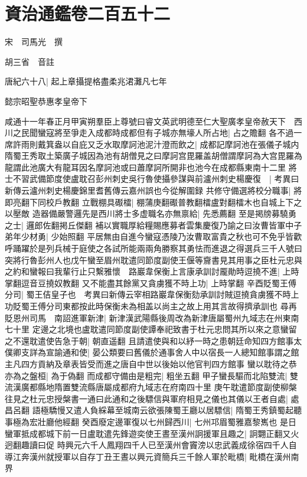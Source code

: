 \chapter{資治通鑑卷二百五十二}
宋　司馬光　撰

胡三省　音註

唐紀六十八|{
	起上章攝提格盡柔兆涒灘凡七年}


懿宗昭聖恭惠孝皇帝下

咸通十一年春正月甲寅朔羣臣上尊號曰睿文英武明德至仁大聖廣孝皇帝赦天下　西川之民聞蠻寇將至爭走入成都時成都但有子城亦無壕人所占地|{
	占之贍翻}
各不過一席許雨則戴箕盎以自庇又乏水取摩訶池泥汁澄而飲之|{
	成都記摩訶池在張儀子城内隋蜀王秀取土築廣子城因為池有胡僧見之曰摩訶宫毘羅盖胡僧謂摩訶為大宫毘羅為龍謂此池廣大有龍耳因名摩訶池或曰蕭摩訶所開非也池今在成都縣東南十二里}
將士不習武備節度使盧耽召彭州刺史吳行魯使攝參謀與前瀘州刺史楊慶復　|{
	考異曰新傳云瀘州刺史楊慶錦里耆舊傳云嘉州誤也今從解圍録}
共修守備選將校分職事|{
	將即亮翻下同校戶教翻}
立戰棚具礟檑|{
	棚蒲庚翻礟普教翻檑盧對翻檑木也自城上下之以壓敵}
造器備嚴警邏先是西川將士多虚職名亦無禀給|{
	先悉薦翻}
至是掲牓募驍勇之士|{
	邏郎佐翻掲丘傑翻}
補以實職厚給糧賜應募者雲集慶復乃諭之曰汝曹皆軍中子弟年少材勇|{
	少始照翻}
平居無由自進今蠻寇憑陵乃汝曹取富貴之秋也可不免乎皆歡呼踊躍於是列兵械于庭使之各試所能兩兩角勝察其勇怯而進退之得選兵三千人號曰突將行魯彭州人也戊午蠻至眉州耽遣同節度副使王偃等齎書見其用事之臣杜元忠與之約和蠻報曰我輩行止只繫雅懷　路巖韋保衡上言康承訓討龎勛時逗撓不進|{
	上時掌翻逗音豆撓奴教翻}
又不能盡其餘黨又貪虜獲不時上功|{
	上時掌翻}
辛酉貶蜀王傅分司|{
	蜀王佶皇子也　考異曰新傳云宰相路巖韋保衡劾承訓討賊逗撓貪虜獲不時上功貶蜀王傅分司東都按此時保衡未為相盖以尚主之故上用其言故得擠承訓也}
尋再貶恩州司馬　南詔進軍新津|{
	新津漢武陽縣後周改為新津唐屬蜀州九域志在州東南七十里}
定邊之北境也盧耽遣同節度副使譚奉祀致書于杜元忠問其所以來之意蠻留之不還耽遣使告急于朝|{
	朝直遥翻}
且請遣使與和以紓一時之患朝廷命知四方館事太僕卿支詳為宣諭通和使|{
	晏公類要曰舊儀於通事舍人中以宿長一人總知館事謂之館主凡四方貢納及章表皆受而進之唐自中世以後始以他官判四方館事}
蠻以耽待之恭亦為之盤桓|{
	為于偽翻}
而成都守備由是粗完|{
	粗坐五翻}
甲子蠻長驅而北陷雙流|{
	雙流漢廣都縣地隋置雙流縣唐屬成都府九域志在府南四十里}
庚午耽遣節度副使柳槃往見之杜元忠授槃書一通曰此通和之後驃信與軍府相見之儀也其儀以王者自處|{
	處昌呂翻}
語極驕慢又遣人負綵幕至城南云欲張陳蜀王廳以居驃信|{
	隋蜀王秀鎮蜀起聽事極為宏壯廳他經翻}
癸酉廢定邊軍復以七州歸西川|{
	七州邛眉蜀雅嘉黎嶲也}
是日蠻軍抵成都城下前一日盧耽遣先鋒遊奕使王晝至漢州詗援軍且趣之|{
	詗翾正翻又火迥翻趣讀曰促}
時興元六千人鳳翔四千人已至漢州會竇滂以忠武義成徐宿四千人自導江奔漢州就授軍以自存丁丑王晝以興元資簡兵三千餘人軍於毗橋|{
	毗橋在漢州南界}
